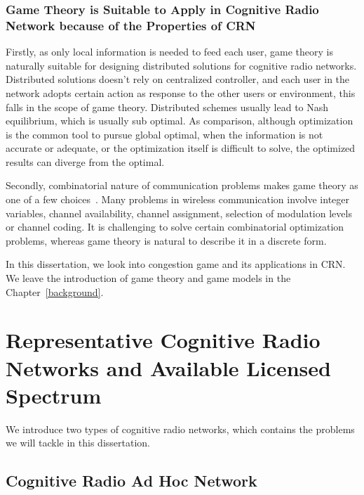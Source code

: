 \subsubsection{Game Theory is Suitable to Apply in Cognitive Radio Network because of the Properties of CRN}
Firstly, as only local information is needed to feed each user, game theory is naturally suitable for designing distributed solutions for cognitive radio networks.
Distributed solutions doesn't rely on centralized controller, and each user in the network adopts certain action as response to the other users or environment, this falls in the scope of game theory.
Distributed schemes usually lead to Nash equilibrium, which is usually sub optimal.
As comparison, although optimization is the common tool to pursue global optimal, when the information is not accurate or adequate, or the optimization itself is difficult to solve, the optimized results can diverge from the optimal.

%
Secondly, combinatorial nature of communication problems makes game theory as one of a few choices~\cite{Han:2008:RAW:1457343}.
Many problems in wireless communication involve integer variables, \ie channel availability, channel assignment, selection of modulation levels or channel coding.
It is challenging to solve certain combinatorial optimization problems, whereas game theory is natural to describe it in a discrete form.


In this dissertation, we look into congestion game and its applications in CRN.
We leave the introduction of game theory and game models in the Chapter~\ref{background}.






\section{Representative Cognitive Radio Networks and Available Licensed Spectrum}
We introduce two types of cognitive radio networks, which contains the problems we will tackle in this dissertation.

\subsection{Cognitive Radio Ad Hoc Network}


